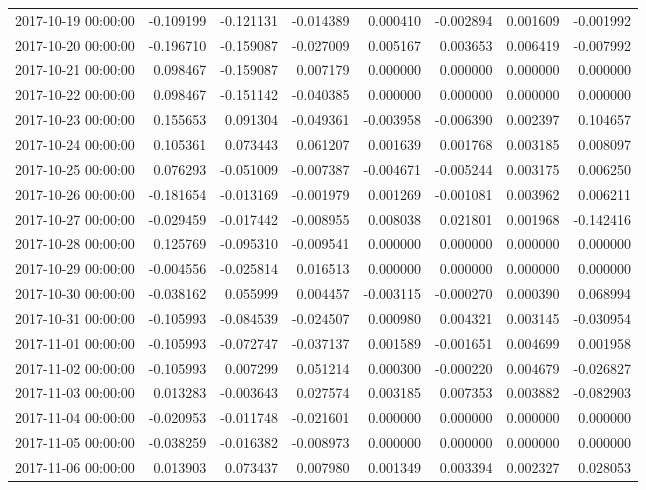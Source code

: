 \begin{tabular}{lrrrrrrr}
2017-10-19 00:00:00 & -0.109199 & -0.121131 & -0.014389 & 0.000410 & -0.002894 & 0.001609 & -0.001992 \\
2017-10-20 00:00:00 & -0.196710 & -0.159087 & -0.027009 & 0.005167 & 0.003653 & 0.006419 & -0.007992 \\
2017-10-21 00:00:00 & 0.098467 & -0.159087 & 0.007179 & 0.000000 & 0.000000 & 0.000000 & 0.000000 \\
2017-10-22 00:00:00 & 0.098467 & -0.151142 & -0.040385 & 0.000000 & 0.000000 & 0.000000 & 0.000000 \\
2017-10-23 00:00:00 & 0.155653 & 0.091304 & -0.049361 & -0.003958 & -0.006390 & 0.002397 & 0.104657 \\
2017-10-24 00:00:00 & 0.105361 & 0.073443 & 0.061207 & 0.001639 & 0.001768 & 0.003185 & 0.008097 \\
2017-10-25 00:00:00 & 0.076293 & -0.051009 & -0.007387 & -0.004671 & -0.005244 & 0.003175 & 0.006250 \\
2017-10-26 00:00:00 & -0.181654 & -0.013169 & -0.001979 & 0.001269 & -0.001081 & 0.003962 & 0.006211 \\
2017-10-27 00:00:00 & -0.029459 & -0.017442 & -0.008955 & 0.008038 & 0.021801 & 0.001968 & -0.142416 \\
2017-10-28 00:00:00 & 0.125769 & -0.095310 & -0.009541 & 0.000000 & 0.000000 & 0.000000 & 0.000000 \\
2017-10-29 00:00:00 & -0.004556 & -0.025814 & 0.016513 & 0.000000 & 0.000000 & 0.000000 & 0.000000 \\
2017-10-30 00:00:00 & -0.038162 & 0.055999 & 0.004457 & -0.003115 & -0.000270 & 0.000390 & 0.068994 \\
2017-10-31 00:00:00 & -0.105993 & -0.084539 & -0.024507 & 0.000980 & 0.004321 & 0.003145 & -0.030954 \\
2017-11-01 00:00:00 & -0.105993 & -0.072747 & -0.037137 & 0.001589 & -0.001651 & 0.004699 & 0.001958 \\
2017-11-02 00:00:00 & -0.105993 & 0.007299 & 0.051214 & 0.000300 & -0.000220 & 0.004679 & -0.026827 \\
2017-11-03 00:00:00 & 0.013283 & -0.003643 & 0.027574 & 0.003185 & 0.007353 & 0.003882 & -0.082903 \\
2017-11-04 00:00:00 & -0.020953 & -0.011748 & -0.021601 & 0.000000 & 0.000000 & 0.000000 & 0.000000 \\
2017-11-05 00:00:00 & -0.038259 & -0.016382 & -0.008973 & 0.000000 & 0.000000 & 0.000000 & 0.000000 \\
2017-11-06 00:00:00 & 0.013903 & 0.073437 & 0.007980 & 0.001349 & 0.003394 & 0.002327 & 0.028053 \\

\end{tabular}
